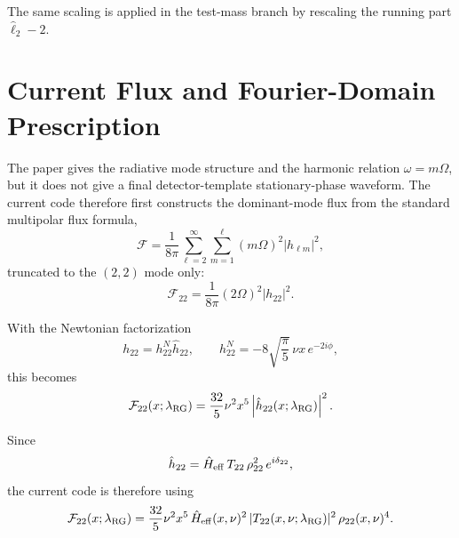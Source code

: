 \documentclass[11pt]{article}
\begin{document}
The same scaling is applied in the test-mass branch by rescaling the running
part \(\hat \ell_2 - 2\).

\section{Current Flux and Fourier-Domain Prescription}

The paper gives the radiative mode structure and the harmonic relation
\(\omega = m \Omega\), but it does not give a final detector-template
stationary-phase waveform. The current code therefore first constructs the
dominant-mode flux from the standard multipolar flux formula,
\begin{equation}
  \mathcal F
  =
  \frac{1}{8\pi}\sum_{\ell=2}^{\infty}\sum_{m=1}^{\ell}
  (m\Omega)^2 |h_{\ell m}|^2,
\end{equation}
truncated to the \((2,2)\) mode only:
\begin{equation}
  \mathcal F_{22}
  =
  \frac{1}{8\pi}(2\Omega)^2 |h_{22}|^2.
\end{equation}

With the Newtonian factorization
\begin{equation}
  h_{22}=h_{22}^N \hat h_{22},
  \qquad
  h_{22}^{N}=-8\sqrt{\frac{\pi}{5}}\,\nu x\,e^{-2i\phi},
\end{equation}
this becomes
\begin{equation}
  \mathcal F_{22}(x;\lambda_{\rm RG})
  =
  \frac{32}{5}\nu^2 x^5
  \left|
    \hat h_{22}(x;\lambda_{\rm RG})
  \right|^2.
\end{equation}

Since
\begin{equation}
  \hat h_{22}
  =
  \hat H_{\rm eff}\,
  T_{22}\,
  \rho_{22}^2\,
  e^{i\delta_{22}},
\end{equation}
the current code is therefore using
\begin{equation}
  \mathcal F_{22}(x;\lambda_{\rm RG})
  =
  \frac{32}{5}\nu^2 x^5\,
  \hat H_{\rm eff}(x,\nu)^2\,
  |T_{22}(x,\nu;\lambda_{\rm RG})|^2\,
  \rho_{22}(x,\nu)^4.
\end{equation}
\end{document}
